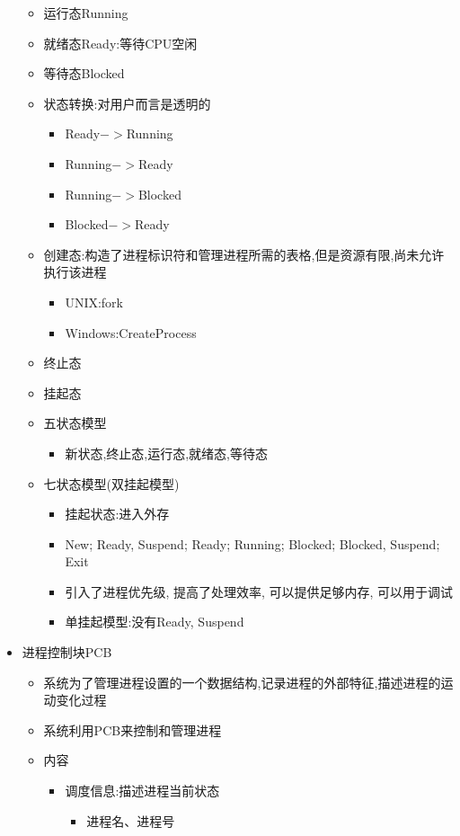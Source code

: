 \documentclass[a4paper,12pt,notitlepage]{article}
\begin{document}
\begin{itemize}
\begin{itemize}
		\item 运行态Running
		\item 就绪态Ready:等待CPU空闲
		\item 等待态Blocked
		\item 状态转换:对用户而言是透明的
		\begin{itemize}
			\item Ready$->$Running
			\item Running$->$Ready
			\item Running$->$Blocked
			\item Blocked$->$Ready
		\end{itemize}
		\item 创建态:构造了进程标识符和管理进程所需的表格,但是资源有限,尚未允许执行该进程
		\begin{itemize}
			\item UNIX:fork
			\item Windows:CreateProcess
		\end{itemize}
		\item 终止态
		\item 挂起态
		\item 五状态模型
		\begin{itemize}
			\item 新状态,终止态,运行态,就绪态,等待态
		\end{itemize}
		\item 七状态模型(双挂起模型)
		\begin{itemize}
			\item 挂起状态:进入外存
			\item New; Ready, Suspend; Ready; Running; Blocked; Blocked, Suspend; Exit
			\item 引入了进程优先级, 提高了处理效率, 可以提供足够内存, 可以用于调试
			\item 单挂起模型:没有Ready, Suspend
		\end{itemize}
	\end{itemize}
	\item 进程控制块PCB
	\begin{itemize}
		\item 系统为了管理进程设置的一个数据结构,记录进程的外部特征,描述进程的运动变化过程
		\item 系统利用PCB来控制和管理进程
		\item 内容
		\begin{itemize}
			\item 调度信息:描述进程当前状态
			\begin{itemize}
				\item 进程名、进程号

\end{itemize}
\end{itemize}
\end{itemize}
\end{itemize}
\end{document}
